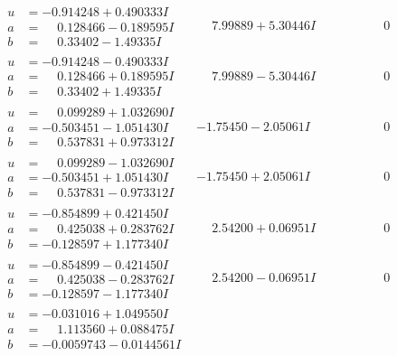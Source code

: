 \documentclass[1p]{elsarticle_modified}
\theoremstyle{definition}
\begin{document}
$$\begin{array}{c|c|c}
\begin{aligned}
u &= -0.914248 + 0.490333 I \\
a &= \phantom{-}0.128466 - 0.189595 I \\
b &= \phantom{-}0.33402 - 1.49335 I\end{aligned}
 & \phantom{-}7.99889 + 5.30446 I & \phantom{-0.000000 } 0 \\ \hline\begin{aligned}
u &= -0.914248 - 0.490333 I \\
a &= \phantom{-}0.128466 + 0.189595 I \\
b &= \phantom{-}0.33402 + 1.49335 I\end{aligned}
 & \phantom{-}7.99889 - 5.30446 I & \phantom{-0.000000 } 0 \\ \hline\begin{aligned}
u &= \phantom{-}0.099289 + 1.032690 I \\
a &= -0.503451 - 1.051430 I \\
b &= \phantom{-}0.537831 + 0.973312 I\end{aligned}
 & -1.75450 - 2.05061 I & \phantom{-0.000000 } 0 \\ \hline\begin{aligned}
u &= \phantom{-}0.099289 - 1.032690 I \\
a &= -0.503451 + 1.051430 I \\
b &= \phantom{-}0.537831 - 0.973312 I\end{aligned}
 & -1.75450 + 2.05061 I & \phantom{-0.000000 } 0 \\ \hline\begin{aligned}
u &= -0.854899 + 0.421450 I \\
a &= \phantom{-}0.425038 + 0.283762 I \\
b &= -0.128597 + 1.177340 I\end{aligned}
 & \phantom{-}2.54200 + 0.06951 I & \phantom{-0.000000 } 0 \\ \hline\begin{aligned}
u &= -0.854899 - 0.421450 I \\
a &= \phantom{-}0.425038 - 0.283762 I \\
b &= -0.128597 - 1.177340 I\end{aligned}
 & \phantom{-}2.54200 - 0.06951 I & \phantom{-0.000000 } 0 \\ \hline\begin{aligned}
u &= -0.031016 + 1.049550 I \\
a &= \phantom{-}1.113560 + 0.088475 I \\
b &= -0.0059743 - 0.0144561 I\end{aligned}

\end{array}$$
\end{document}
